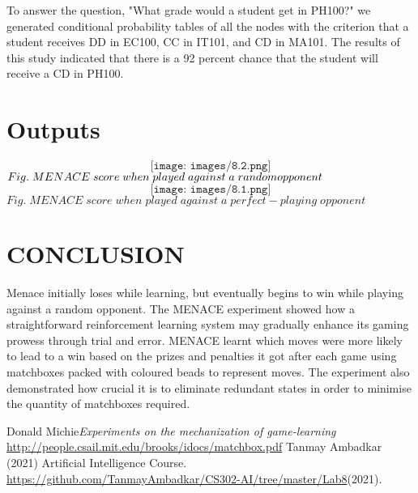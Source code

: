 \documentclass[conference]{IEEEtran}
\begin{document}
To answer the question, "What grade would a student get in PH100?" we generated conditional probability tables of all the nodes with the criterion that a student receives DD in EC100, CC in IT101, and CD in MA101. The results of this study indicated that there is a 92 percent chance that the student will receive a CD in PH100.

\section{Outputs}
$$\texttt{[image: images/8.2.png]}$$
$Fig. \; MENACE \; score \; when \; played \; against \; a \; random \; \\opponent$
$$\texttt{[image: images/8.1.png]}$$
$Fig. \; MENACE \; score \; when \;  played \; against \; a \; perfect-playing \; opponent$

\section{CONCLUSION}
Menace initially loses while learning, but eventually begins to win while playing against a random opponent. The MENACE experiment showed how a straightforward reinforcement learning system may gradually enhance its gaming prowess through trial and error. MENACE learnt which moves were more likely to lead to a win based on the prizes and penalties it got after each game using matchboxes packed with coloured beads to represent moves. The experiment also demonstrated how crucial it is to eliminate redundant states in order to minimise the quantity of matchboxes required.
\begin{thebibliography}{}
\bibitem{}
Donald Michie\emph{Experiments on the mechanization of game-learning} \href{http://people.csail.mit.edu/brooks/idocs/matchbox.pdf}{http://people.csail.mit.edu/brooks/idocs/matchbox.pdf}
\bibitem{}
Tanmay Ambadkar (2021) Artificial Intelligence Course. \href{https://github.com/TanmayAmbadkar/CS302-AI/tree/master/Lab8}{https://github.com/TanmayAmbadkar/CS302-AI/tree/master/Lab8}(2021).
\end{thebibliography}
\end{document}
